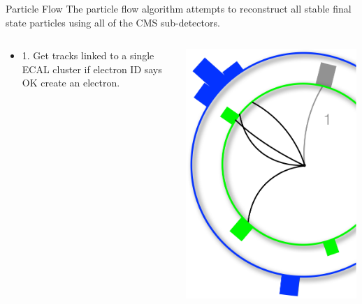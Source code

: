 \begin{frame}{Particle Flow}
The particle flow algorithm attempts to reconstruct all stable final state particles using all of the CMS sub-detectors.

\begin{columns}[T]
  \begin{column}{0.6\textwidth}
\footnotesize
    \begin{itemize}
    \item
      1. Get tracks linked to a single ECAL cluster if electron ID says OK create an electron.
    \end{itemize}
  \end{column}
  \begin{column}{0.40\textwidth}
    \includegraphics[width=0.99\textwidth]{images/pf1.pdf}
  \end{column}
\end{columns}
\end{frame}



